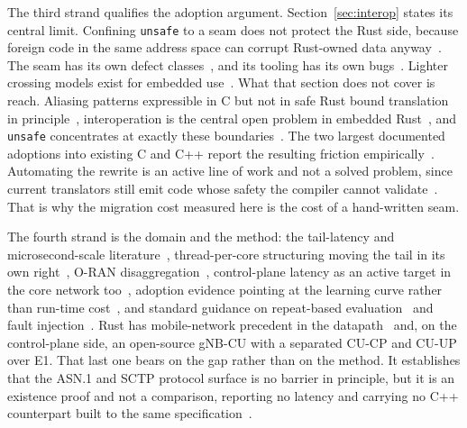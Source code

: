 \documentclass[english,oneside,a4paper,censored,csm,software-track-2020]{HYthesisML}
\begin{document}
The third strand qualifies the adoption argument. Section~\ref{sec:interop} states its central
limit. Confining \texttt{unsafe} to a seam does not protect the Rust side, because foreign code in
the same address space can corrupt Rust-owned data
anyway~\cite{rivera2021galeed,kirth2022pkrusafe}. The seam has its own defect
classes~\cite{li2022crosslang}, and its tooling has its own bugs~\cite{cai2026interop}. Lighter
crossing models exist for embedded use~\cite{schuermann2023encapsulated}. What that section does
not cover is reach. Aliasing patterns expressible in C but not in safe Rust bound translation in
principle~\cite{emre2023aliasing}, interoperation is the central open problem in embedded
Rust~\cite{sharma2024embedded}, and \texttt{unsafe} concentrates at exactly these
boundaries~\cite{mccormack2026unsafe}. The two largest documented adoptions into existing C
and C++ report the resulting friction empirically~\cite{li2026rustlinux,fan2026android}.
Automating the rewrite is an active line of work and not a solved problem, since current
translators still emit code whose safety the compiler cannot validate~\cite{hong2025ctorust}. That
is why the migration cost measured here is the cost of a hand-written seam.

The fourth strand is the domain and the method: the tail-latency and microsecond-scale
literature~\cite{dean2013tail,barroso2017microseconds,li2014tales,huang2017predictability},
thread-per-core structuring moving the tail in its own right~\cite{enberg2019threadpercore}, O-RAN
disaggregation~\cite{polese2023oran}, control-plane latency as an active target in the core network
too~\cite{liu2023l25gc,park2025ctrlbench}, adoption evidence pointing at the learning curve rather
than run-time cost~\cite{fulton2021adopting,crichton2024learning,ardito2021verbosity}, and standard
guidance on repeat-based evaluation~\cite{georges2007rigorous} and fault
injection~\cite{natella2016fault}. Rust has mobile-network precedent in the
datapath~\cite{qazi2017pepc} and, on the control-plane side, an open-source gNB-CU with a separated
CU-CP and CU-UP over E1. That last one bears on the gap rather than on the method. It establishes
that the ASN.1 and SCTP protocol surface is no barrier in principle, but it is an existence proof
and not a comparison, reporting no latency and carrying no C++ counterpart built to the same
specification~\cite{alsoran}.
\end{document}
